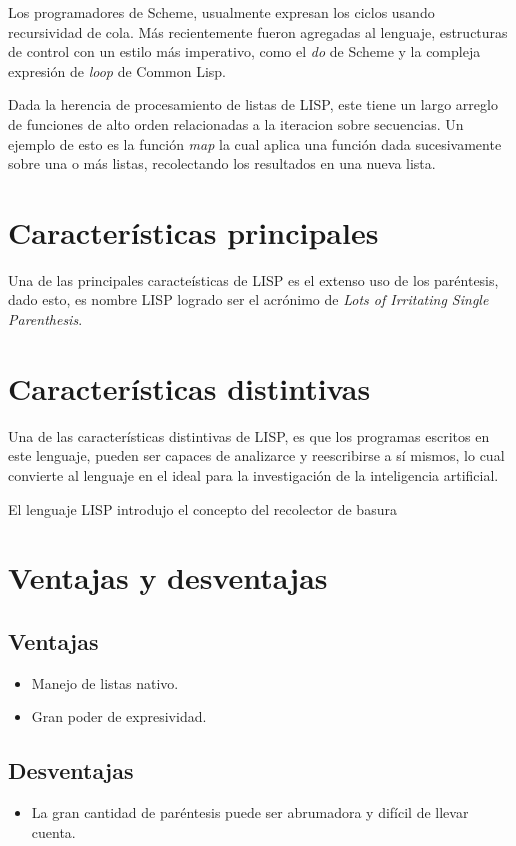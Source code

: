 \documentclass{IEEEtran}
\begin{document}
Los programadores de Scheme, usualmente expresan los ciclos usando recursividad de cola. M\'as recientemente fueron agregadas al lenguaje, estructuras de control con un estilo m\'as imperativo, como el \emph{do} de Scheme y la compleja expresi\'on de \emph{loop} de Common Lisp.

Dada la herencia de procesamiento de listas de LISP, este tiene un largo arreglo de funciones de alto orden relacionadas a la iteracion sobre secuencias. Un ejemplo de esto es la funci\'on \emph{map} la cual aplica una funci\'on dada sucesivamente sobre una o m\'as listas, recolectando los resultados en una nueva lista.

\section{Caracter\'isticas principales}
Una de las principales caracte\'isticas de LISP es el extenso uso de los par\'entesis, dado esto, es nombre LISP
logrado ser el acr\'onimo de \emph{Lots of Irritating Single Parenthesis}.

\section{Caracter\'isticas distintivas}
Una de las caracter\'isticas distintivas de LISP, es que los programas escritos en este lenguaje, pueden ser capaces de analizarce y reescribirse a s\'i mismos, lo cual convierte al lenguaje en el ideal para la investigaci\'on de la inteligencia artificial.

El lenguaje LISP introdujo el concepto del recolector de basura

\section{Ventajas y desventajas}
\subsection{Ventajas}
\begin{itemize}
  \item Manejo de listas nativo.
  \item Gran poder de expresividad.
\end{itemize}
\subsection{Desventajas}
\begin{itemize}
  \item La gran cantidad de par\'entesis puede ser abrumadora y dif\'icil de llevar cuenta.
\end{itemize}
\end{document}
